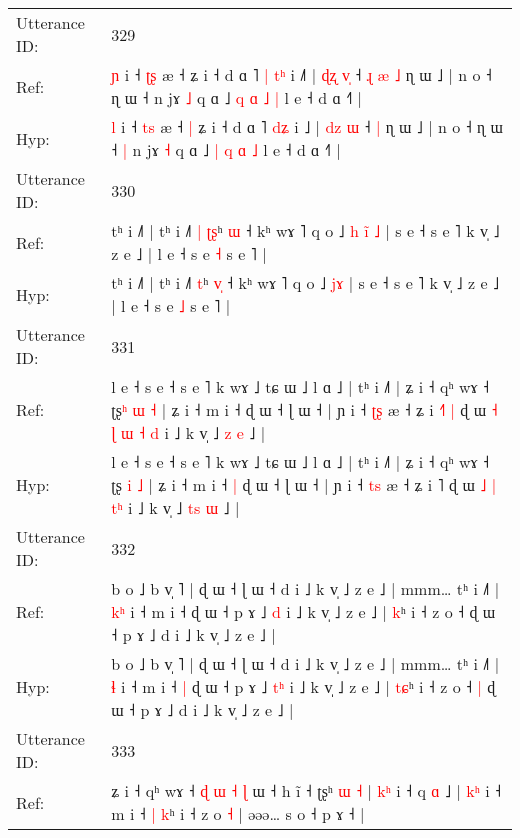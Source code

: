 \documentclass[10pt]{article}
\DeclareRobustCommand{\hl}[1]{{\textcolor{red}{#1}}}
\begin{document}
\begin{longtable}{ll}
 \\
\midrule
Utterance ID: & 329 \\
Ref: & \hl{ɲ} i ˧ \hl{ʈ}\hl{ʂ} æ ˧\hl{}\hl{} ʑ i ˧ d ɑ ˥\hl{ }\hl{|} \hl{t}\hl{ʰ} i ˩\hl{˥} | \hl{ɖ}\hl{ʐ} \hl{v}\hl{̩} ˧\hl{ }\hl{ɻ}\hl{ }\hl{æ} \hl{˩} ɳ ɯ ˩ | n o ˧ ɳ ɯ ˧\hl{}\hl{} n jɤ \hl{˩} q ɑ ˩ \hl{q} \hl{ɑ} \hl{˩} \hl{|} l e ˧ d ɑ ˧˥ |
 \\
Hyp: & \hl{l} i ˧ \hl{t}\hl{s} æ ˧\hl{ }\hl{|} ʑ i ˧ d ɑ ˥\hl{}\hl{} \hl{d}\hl{ʑ} i ˩\hl{} | \hl{d}\hl{z} \hl{}\hl{ɯ} ˧\hl{}\hl{}\hl{}\hl{} \hl{|} ɳ ɯ ˩ | n o ˧ ɳ ɯ ˧\hl{ }\hl{|} n jɤ \hl{˧} q ɑ ˩ \hl{|} \hl{q} \hl{ɑ} \hl{˩} l e ˧ d ɑ ˧˥ |
 \\
\midrule
Utterance ID: & 330 \\
Ref: & tʰ i ˩˥ | tʰ i ˩˥\hl{ }\hl{|} \hl{ʈ}\hl{ʂ}ʰ \hl{}\hl{ɯ} ˧ kʰ wɤ ˥ q o ˩\hl{ }\hl{h} \hl{i}\hl{̃}\hl{ }\hl{˩} | s e ˧ s e ˥ k v̩ ˩ z e ˩ | l e ˧ s e \hl{˧} s e ˥ |
 \\
Hyp: & tʰ i ˩˥ | tʰ i ˩˥\hl{}\hl{} \hl{}\hl{t}ʰ \hl{v}\hl{̩} ˧ kʰ wɤ ˥ q o ˩\hl{}\hl{} \hl{}\hl{}\hl{j}\hl{ɤ} | s e ˧ s e ˥ k v̩ ˩ z e ˩ | l e ˧ s e \hl{˩} s e ˥ |
 \\
\midrule
Utterance ID: & 331 \\
Ref: & l e ˧ s e ˧ s e ˥ k wɤ ˩ tɕ ɯ ˩ l ɑ ˩ | tʰ i ˩˥ | ʑ i ˧ qʰ wɤ ˧ ʈʂ\hl{ʰ} \hl{ɯ} \hl{˧} | ʑ i ˧ m i ˧\hl{}\hl{} ɖ ɯ ˧ ɭ ɯ ˧ | ɲ i ˧ \hl{ʈ}\hl{ʂ} æ ˧ ʑ i \hl{˧}˥\hl{ }\hl{|} ɖ ɯ\hl{ }\hl{˧} \hl{ɭ} \hl{ɯ} \hl{˧}\hl{ }\hl{d} i ˩ k v̩ ˩ \hl{}\hl{z} \hl{e} ˩ |
 \\
Hyp: & l e ˧ s e ˧ s e ˥ k wɤ ˩ tɕ ɯ ˩ l ɑ ˩ | tʰ i ˩˥ | ʑ i ˧ qʰ wɤ ˧ ʈʂ\hl{} \hl{i} \hl{˩} | ʑ i ˧ m i ˧\hl{ }\hl{|} ɖ ɯ ˧ ɭ ɯ ˧ | ɲ i ˧ \hl{t}\hl{s} æ ˧ ʑ i \hl{}˥\hl{}\hl{} ɖ ɯ\hl{}\hl{} \hl{˩} \hl{|} \hl{}\hl{t}\hl{ʰ} i ˩ k v̩ ˩ \hl{t}\hl{s} \hl{ɯ} ˩ |
 \\
\midrule
Utterance ID: & 332 \\
Ref: & b o ˩ b v̩ ˥ | ɖ ɯ ˧ ɭ ɯ ˧ d i ˩ k v̩ ˩ z e ˩ | mmm… tʰ i ˩˥ | \hl{k}\hl{ʰ} i ˧ m i ˧\hl{}\hl{} ɖ ɯ ˧ p ɤ ˩ \hl{}\hl{d} i ˩ k v̩ ˩ z e ˩ | \hl{}\hl{k}ʰ i ˧ z o ˧\hl{}\hl{} ɖ ɯ ˧ p ɤ ˩ d i ˩ k v̩ ˩ z e ˩ |
 \\
Hyp: & b o ˩ b v̩ ˥ | ɖ ɯ ˧ ɭ ɯ ˧ d i ˩ k v̩ ˩ z e ˩ | mmm… tʰ i ˩˥ | \hl{}\hl{ɬ} i ˧ m i ˧\hl{ }\hl{|} ɖ ɯ ˧ p ɤ ˩ \hl{t}\hl{ʰ} i ˩ k v̩ ˩ z e ˩ | \hl{t}\hl{ɕ}ʰ i ˧ z o ˧\hl{ }\hl{|} ɖ ɯ ˧ p ɤ ˩ d i ˩ k v̩ ˩ z e ˩ |
 \\
\midrule
Utterance ID: & 333 \\
Ref: & ʑ i ˧ qʰ wɤ ˧\hl{ }\hl{ɖ}\hl{ }\hl{ɯ} \hl{˧} \hl{ɭ} ɯ ˧ h ĩ ˧ ʈʂʰ \hl{ɯ} \hl{˧} | \hl{k}\hl{ʰ} i ˧ q \hl{ɑ} ˩ | \hl{k}\hl{ʰ} i ˧ m i ˧ \hl{|}\hl{ }\hl{k}ʰ i ˧ z o \hl{˧} | əəə… s o ˧ p ɤ ˧ |

\end{longtable}
\end{document}
